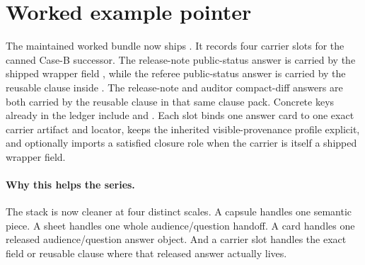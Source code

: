 \documentclass[11pt]{article}
\begin{document}
\section{Worked example pointer}
The maintained worked bundle now ships .\cite{series:workedexample}
It records four carrier slots for the canned Case-B successor.
The release-note public-status answer is carried by the shipped wrapper field , while the referee public-status answer is carried by the reusable clause  inside .
The release-note and auditor compact-diff answers are both carried by the reusable clause  in that same clause pack.
Concrete keys already in the ledger include  and .
Each slot binds one answer card to one exact carrier artifact and locator, keeps the inherited visible-provenance profile explicit, and optionally imports a satisfied closure role when the carrier is itself a shipped wrapper field.

\paragraph{Why this helps the series.}
The stack is now cleaner at four distinct scales.
A capsule handles one semantic piece.
A sheet handles one whole audience/question handoff.
A card handles one released audience/question answer object.
And a carrier slot handles the exact field or reusable clause where that released answer actually lives.
\end{document}
